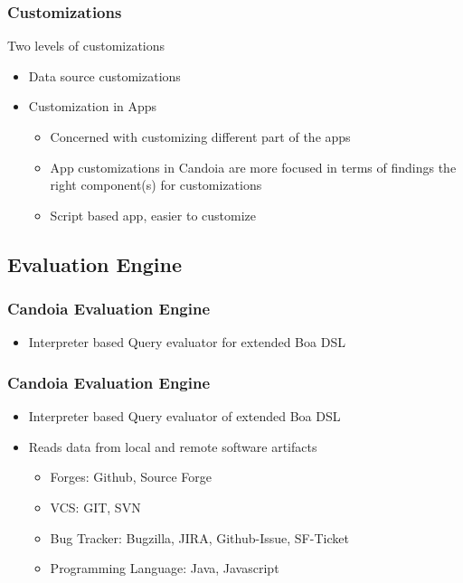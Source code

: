         \begin{frame}
        \frametitle{Customizations}
            Two levels of customizations
            \begin{itemize}
                \item Data source customizations
                \item Customization in Apps
                    \begin{itemize}
                        \item Concerned with customizing different part of the apps
                        \item App customizations in Candoia are more focused in terms of findings the right component(s) for customizations
                        \item Script based app, easier to customize
                    \end{itemize}
            \end{itemize}
        \end{frame}


    \subsection{Evaluation Engine}
        \begin{frame}
            \frametitle{Candoia Evaluation Engine}
            \begin{itemize}
                \item Interpreter based Query evaluator for extended Boa DSL
            \end{itemize}
        \end{frame}

        \begin{frame}
            \frametitle{Candoia Evaluation Engine}
            \begin{itemize}
                \item Interpreter based Query evaluator of extended Boa DSL
                \item Reads data from local and remote software artifacts
                    \begin{itemize}
                        \item Forges: Github, Source Forge
                        \item VCS: GIT, SVN
                        \item Bug Tracker: Bugzilla, JIRA, Github-Issue, SF-Ticket
                        \item Programming Language: Java, Javascript
                    \end{itemize}
                \end{itemize}
            \end{frame}




